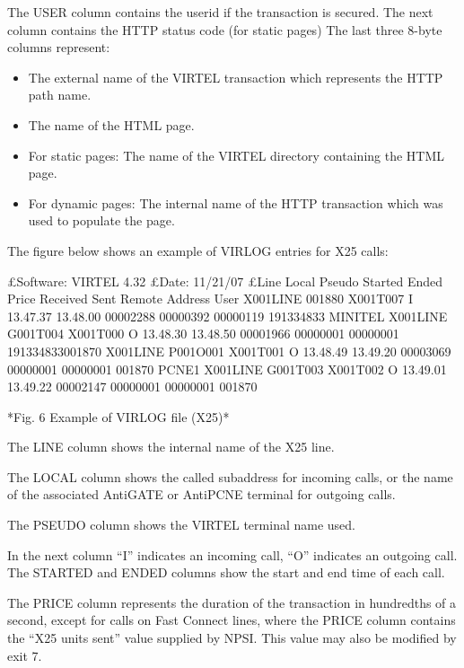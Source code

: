 \documentclass[letterpaper,10pt,english]{sphinxmanual}
\begin{document}
The USER column contains the userid if the transaction is secured.
The next column contains the HTTP status code (for static pages) The last three 8-byte columns represent:
\begin{itemize}
\item {} 
The external name of the VIRTEL transaction which represents the HTTP path name.

\item {} 
The name of the HTML page.

\item {} 
For static pages: The name of the VIRTEL directory containing the HTML page.

\item {} 
For dynamic pages: The internal name of the HTTP transaction which was used to populate the page.

\end{itemize}

The figure below shows an example of VIRLOG entries for X25 calls:

\begin{sphinxVerbatim}[commandchars=\\\{\}]
£Software: VIRTEL 4.32
£Date: 11/21/07
£Line Local Pseudo Started Ended Price Received Sent Remote Address User
X001LINE 001880 X001T007 I 13.47.37 13.48.00 00002288 00000392 00000119 191334833 MINITEL
X001LINE G001T004 X001T000 O 13.48.30 13.48.50 00001966 00000001 00000001 191334833001870
X001LINE P001O001 X001T001 O 13.48.49 13.49.20 00003069 00000001 00000001 001870 PCNE1
X001LINE G001T003 X001T002 O 13.49.01 13.49.22 00002147 00000001 00000001 001870

*Fig. 6 Example of VIRLOG file (X25)*
\end{sphinxVerbatim}

The LINE column shows the internal name of the X25 line.

The LOCAL column shows the called subaddress for incoming calls, or the name of the associated AntiGATE or AntiPCNE terminal for outgoing calls.

The PSEUDO column shows the VIRTEL terminal name used.

In the next column “I” indicates an incoming call, “O” indicates an outgoing call. The STARTED and ENDED columns show the start and end time of each call.

The PRICE column represents the duration of the transaction in hundredths of a second, except for calls on Fast Connect lines, where the PRICE column contains the “X25 units sent” value supplied by NPSI. This value may also be modified by exit 7.
\end{document}
